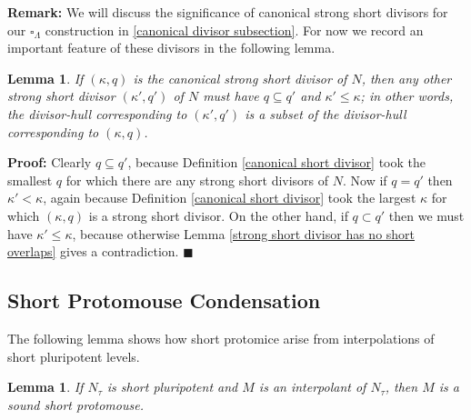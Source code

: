 \documentclass[12pt]{article}
\newtheorem{lem}[thm]{Lemma}
\begin{document}
\textbf{Remark:}  We will discuss the significance of canonical strong short divisors for our $\square_\Lambda$ construction in \ref{canonical divisor subsection}.  For now we record an important feature of these divisors in the following lemma.\\

\begin{lem} \label{canonical short biggest hull}
If $(\kappa, q)$ is the canonical strong short divisor of $N$, then any other strong short divisor $(\kappa' , q')$ of $N$ must have $q \subseteq q'$ and $\kappa' \leq \kappa$; in other words, the divisor-hull corresponding to $(\kappa' , q')$ is a subset of the divisor-hull corresponding to $(\kappa , q)$.
\end{lem}

\textbf{Proof:} Clearly $q \subseteq q'$, because Definition \ref{canonical short divisor} took the smallest $q$ for which there are any strong short divisors of $N$.  Now if $q = q'$ then $\kappa' < \kappa$, again because Definition \ref{canonical short divisor} took the largest $\kappa$ for which $(\kappa , q)$ is a strong short divisor.  On the other hand, if $q \subset q'$ then we must have $\kappa' \leq \kappa$, because otherwise Lemma \ref{strong short divisor has no short overlaps} gives a contradiction. $\blacksquare$\\





\subsection{Short Protomouse Condensation}


The following lemma shows how short protomice arise from interpolations of short pluripotent levels.\\



\begin{lem} \label{short pluripotent interpolates to short protomouse}
If $N_\tau$ is short pluripotent and $M$ is an interpolant of $N_\tau$, then $M$ is a sound short protomouse.
\end{lem}
\end{document}
